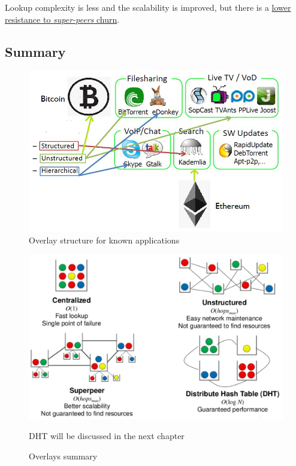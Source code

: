 Lookup complexity is less and the scalability is improved, but there is a \ul{lower resistance to \textit{super-peers} churn}.


\subsection{Summary}
\begin{figure}[htbp]
   \centering
   \includegraphics{images/overlays_applications.png}
   \caption{Overlay structure for known applications}
   \label{fig:overlays_applications}
\end{figure}

\begin{figure}[htbp]
   \centering
   \includegraphics{images/overlays_summary.png}
   \caption{Overlays summary}
   \label{fig:overlays_summary}
   DHT will be discussed in the next chapter
\end{figure}